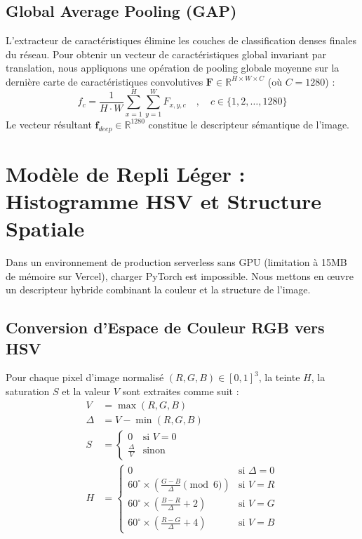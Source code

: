 \documentclass[12pt,a4paper]{article}
\begin{document}
\subsection{Global Average Pooling (GAP)}
L'extracteur de caractéristiques élimine les couches de classification denses finales du réseau. Pour obtenir un vecteur de caractéristiques global invariant par translation, nous appliquons une opération de pooling globale moyenne sur la dernière carte de caractéristiques convolutives $\mathbf{F} \in \mathbb{R}^{H \times W \times C}$ (où $C = 1280$) :
\begin{equation}
    f_c = \frac{1}{H \cdot W} \sum_{x=1}^{H} \sum_{y=1}^{W} F_{x,y,c} \quad , \quad c \in \{1, 2, \dots, 1280\}
\end{equation}
Le vecteur résultant $\mathbf{f}_{deep} \in \mathbb{R}^{1280}$ constitue le descripteur sémantique de l'image.

\section{Modèle de Repli Léger : Histogramme HSV et Structure Spatiale}
Dans un environnement de production serverless sans GPU (limitation à 15MB de mémoire sur Vercel), charger PyTorch est impossible. Nous mettons en œuvre un descripteur hybride combinant la couleur et la structure de l'image.

\subsection{Conversion d'Espace de Couleur RGB vers HSV}
Pour chaque pixel d'image normalisé $(R, G, B) \in [0, 1]^3$, la teinte $H$, la saturation $S$ et la valeur $V$ sont extraites comme suit :
\begin{align}
    V &= \max(R, G, B) \\
    \Delta &= V - \min(R, G, B) \\
    S &= \begin{cases} 
        0 & \text{si } V = 0 \\ 
        \frac{\Delta}{V} & \text{sinon} 
    \end{cases} \\
    H &= \begin{cases}
        0 & \text{si } \Delta = 0 \\
        60^\circ \times \left( \frac{G - B}{\Delta} \pmod 6 \right) & \text{si } V = R \\
        60^\circ \times \left( \frac{B - R}{\Delta} + 2 \right) & \text{si } V = G \\
        60^\circ \times \left( \frac{R - G}{\Delta} + 4 \right) & \text{si } V = B
    \end{cases}
\end{align}
\end{document}
